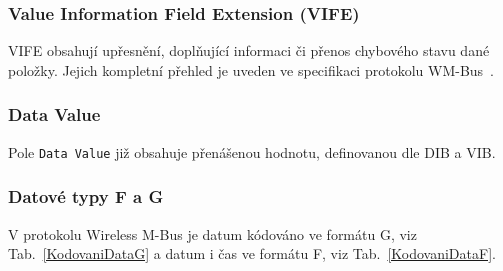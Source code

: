 \subsubsection{Value Information Field Extension (VIFE)}
VIFE obsahují upřesnění, doplňující informaci či přenos chybového stavu dané položky. Jejich kompletní přehled je uveden ve specifikaci protokolu WM-Bus~\cite{WmBusSpecka}.


\subsubsection{Data Value}
Pole \texttt{Data Value} již obsahuje přenášenou hodnotu, definovanou dle DIB a VIB.


\subsubsection{Datové typy F a G}
V protokolu Wireless M-Bus je datum kódováno ve formátu G, viz Tab.~\ref{KodovaniDataG} a datum i čas ve formátu F, viz Tab.~\ref{KodovaniDataF}.  

